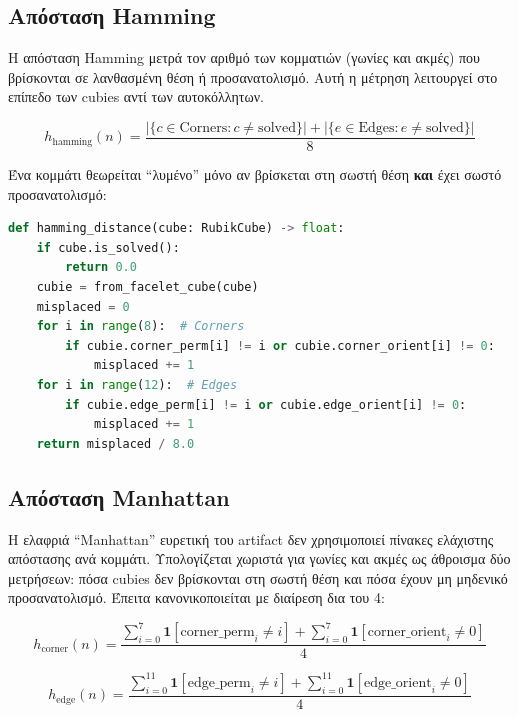 \subsection{Απόσταση Hamming}
\label{subsec:hamming-distance}

Η απόσταση Hamming μετρά τον αριθμό των κομματιών (γωνίες και ακμές) που βρίσκονται σε λανθασμένη θέση ή προσανατολισμό. Αυτή η μέτρηση λειτουργεί στο επίπεδο των cubies αντί των αυτοκόλλητων.

\begin{equation}
\label{eq:hamming-distance}
h_{\text{hamming}}(n) = \frac{|\{c \in \text{Corners} : c \neq \text{solved}\}| + |\{e \in \text{Edges} : e \neq \text{solved}\}|}{8}
\end{equation}

Ένα κομμάτι θεωρείται ``λυμένο'' μόνο αν βρίσκεται στη σωστή θέση \textbf{και} έχει σωστό προσανατολισμό:

\begin{lstlisting}[language=Python, caption={Υλοποίηση απόστασης Hamming (src/korf/heuristics.py:62-94)}]
def hamming_distance(cube: RubikCube) -> float:
    if cube.is_solved():
        return 0.0
    cubie = from_facelet_cube(cube)
    misplaced = 0
    for i in range(8):  # Corners
        if cubie.corner_perm[i] != i or cubie.corner_orient[i] != 0:
            misplaced += 1
    for i in range(12):  # Edges
        if cubie.edge_perm[i] != i or cubie.edge_orient[i] != 0:
            misplaced += 1
    return misplaced / 8.0
\end{lstlisting}

\subsection{Απόσταση Manhattan}
\label{subsec:manhattan-distance}

Η ελαφριά ``Manhattan'' ευρετική του artifact δεν χρησιμοποιεί πίνακες
ελάχιστης απόστασης ανά κομμάτι. Υπολογίζεται χωριστά για γωνίες και ακμές ως
άθροισμα δύο μετρήσεων: πόσα cubies δεν βρίσκονται στη σωστή θέση και πόσα έχουν
μη μηδενικό προσανατολισμό. Έπειτα κανονικοποιείται με διαίρεση δια του 4:

\begin{equation}
\label{eq:manhattan-corner}
h_{\text{corner}}(n) =
\frac{\sum_{i=0}^{7}\mathbf{1}[\text{corner\_perm}_i \neq i]
+ \sum_{i=0}^{7}\mathbf{1}[\text{corner\_orient}_i \neq 0]}{4}
\end{equation}

\begin{equation}
\label{eq:manhattan-edge}
h_{\text{edge}}(n) =
\frac{\sum_{i=0}^{11}\mathbf{1}[\text{edge\_perm}_i \neq i]
+ \sum_{i=0}^{11}\mathbf{1}[\text{edge\_orient}_i \neq 0]}{4}
\end{equation}

